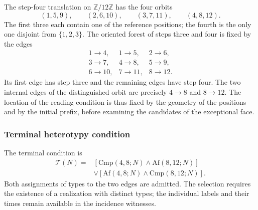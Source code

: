 The step-four translation on $\mathbb Z/12\mathbb Z$ has the
four orbits
\[
 (1,5,9),\qquad(2,6,10),\qquad(3,7,11),\qquad(4,8,12).
\]
The first three each contain one of the reference
positions; the fourth is the only one disjoint from $\{1,2,3\}$. The oriented
forest of steps three and four is fixed by the edges
\[
 \begin{array}{lll}
 1\to4,&1\to5,&2\to6,\\
 3\to7,&4\to8,&5\to9,\\
 6\to10,&7\to11,&8\to12.
 \end{array}
\]
Its first edge has step three and the remaining edges have step four. The two
internal edges of the distinguished orbit are precisely
$4\to8$ and $8\to12$. The location of the reading condition is thus
fixed by the geometry of the positions and by the initial prefix,
before examining the candidates of the exceptional face.

\subsubsection{Terminal heterotypy condition}

The terminal condition is
\begin{equation}
 \begin{split}
 \mathcal T(N)={}&
 [\mathrm{Cmp}(4,8;N)\wedge\mathrm{Af}(8,12;N)]\\
 &\vee[\mathrm{Af}(4,8;N)\wedge\mathrm{Cmp}(8,12;N)].
 \end{split}
 \label{eq:kdes-heterotipia}
\end{equation}
Both assignments of types to the two edges are admitted. The
selection requires the existence of a realization with distinct types; the
individual labels and their times remain available in the
incidence witnesses.


